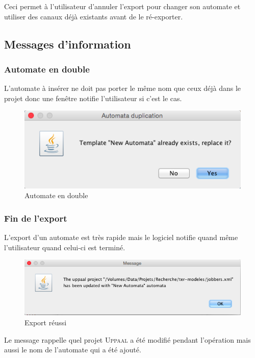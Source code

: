 \documentclass[12pt,a4paper]{report}
\begin{document}
Ceci permet à l'utilisateur d'annuler l'export pour changer son automate et utiliser 
des canaux déjà existants avant de le ré-exporter.

\subsection{Messages d'information}
\subsubsection*{Automate en double}
L'automate à insérer ne doit pas porter le même nom que ceux déjà dans le projet donc
une fenêtre notifie l'utilisateur si c'est le cas.

\begin{figure}[h]
  \centering
  \includegraphics[scale=0.6]{ressources/gui/exists.png}
  \caption{Automate en double}
\end{figure}

\subsubsection*{Fin de l'export}
L'export d'un automate est très rapide mais le logiciel notifie quand même 
l'utilisateur quand celui-ci est terminé. 

\begin{figure}[h]
  \centering
  \includegraphics[scale=0.6]{ressources/gui/success.png}
  \caption{Export réussi}
\end{figure}

Le message rappelle quel projet \textsc{Uppaal} a été modifié pendant l'opération mais 
aussi le nom de l'automate qui a été ajouté.
\end{document}
